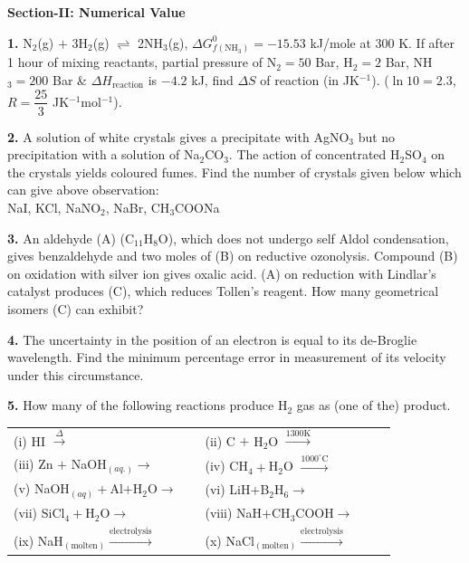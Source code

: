 \documentclass[10pt,twocolumn]{extarticle}
\renewcommand{\arraystretch}{1.15}
\newcommand{\subsectionhdr}[1]{\par\vspace{3pt}\noindent\textbf{#1}\par\vspace{2pt}}
\begin{document}
\subsectionhdr{Section-II: Numerical Value}

\textbf{1.} N$_2$(g) $+$ 3H$_2$(g) $\rightleftharpoons$ 2NH$_3$(g), $\Delta G^0_{f(\text{NH}_3)}=-15.53$ kJ/mole at 300 K. If after 1 hour of mixing reactants, partial pressure of N$_2=50$ Bar, H$_2=2$ Bar, NH$_3=200$ Bar \& $\Delta H_{\text{reaction}}$ is $-4.2$ kJ, find $\Delta S$ of reaction (in JK$^{-1}$). ($\ln10=2.3$, $R=\dfrac{25}{3}$ JK$^{-1}$mol$^{-1}$).

\textbf{2.} A solution of white crystals gives a precipitate with AgNO$_3$ but no precipitation with a solution of Na$_2$CO$_3$. The action of concentrated H$_2$SO$_4$ on the crystals yields coloured fumes. Find the number of crystals given below which can give above observation:\\
NaI, KCl, NaNO$_2$, NaBr, CH$_3$COONa

\textbf{3.} An aldehyde (A) (C$_{11}$H$_8$O), which does not undergo self Aldol condensation, gives benzaldehyde and two moles of (B) on reductive ozonolysis. Compound (B) on oxidation with silver ion gives oxalic acid. (A) on reduction with Lindlar's catalyst produces (C), which reduces Tollen's reagent. How many geometrical isomers (C) can exhibit?

\textbf{4.} The uncertainty in the position of an electron is equal to its de-Broglie wavelength. Find the minimum percentage error in measurement of its velocity under this circumstance.

\textbf{5.} How many of the following reactions produce H$_2$ gas as (one of the) product.

\begin{center}
\renewcommand{\arraystretch}{1.3}
\begin{tabular}{@{}p{0.46\linewidth}p{0.46\linewidth}@{}}
(i) HI $\xrightarrow{\Delta}$ & (ii) C $+$ H$_2$O $\xrightarrow{1300\text{K}}$ \\
(iii) Zn $+$ NaOH$_{(aq.)}\longrightarrow$ & (iv) CH$_4+$H$_2$O $\xrightarrow{1000^\circ\text{C}}$ \\
(v) NaOH$_{(aq)}+$Al$+$H$_2$O$\longrightarrow$ & (vi) LiH$+$B$_2$H$_6\longrightarrow$ \\
(vii) SiCl$_4+$H$_2$O$\longrightarrow$ & (viii) NaH$+$CH$_3$COOH$\longrightarrow$ \\
(ix) NaH$_{(\text{molten})}\xrightarrow{\text{electrolysis}}$ & (x) NaCl$_{(\text{molten})}\xrightarrow{\text{electrolysis}}$ \\
\end{tabular}
\renewcommand{\arraystretch}{1.15}
\end{center}
\end{document}
